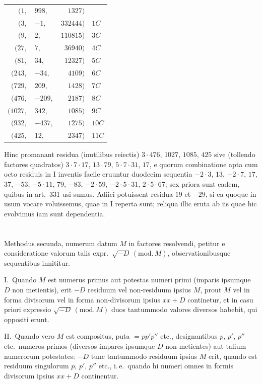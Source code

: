 \documentclass[12pt,a4paper]{article}
\theoremstyle{plain}
\theoremstyle{definition}
\theoremstyle{remark}
\begin{document}
\begin{center}
\begin{tabular}{rlrl}
$(1,$ & $998,$ & $1327)$ &\\
$(3,$ & $-1,$ & $332444)$ & $1C$\\
$(9,$ & $2,$ & $110815)$ & $3C$\\
$(27,$ & $7,$ & $36940)$ & $4C$\\
$(81,$ & $34,$ & $12327)$ & $5C$\\
$(243,$ & $-34,$ & $4109)$ & $6C$\\
$(729,$ & $209,$ & $1428)$ & $7C$\\
$(476,$ & $-209,$ & $2187)$ & $8C$\\
$(1027,$ & $342,$ & $1085)$ & $9C$\\
$(932,$ & $-437,$ & $1275)$ & $10C$\\
$(425,$ & $12,$ & $2347)$ & $11C$
\end{tabular}
\end{center}

Hinc promanant residua (inutilibus reiectis) $3\cdot 476$, $1027$, $1085$, $425$ sive (tollendo factores quadratos) $3\cdot 7\cdot 17$, $13\cdot 79$, $5\cdot 7\cdot 31$, $17$, e quorum combinatione apta cum octo residuis in I inventis facile eruuntur duodecim sequentia $-2\cdot 3$, $13$, $-2\cdot 7$, $17$, $37$, $-53$, $-5\cdot 11$, $79$, $-83$, $-2\cdot 59$, $-2\cdot 5\cdot 31$, $2\cdot 5\cdot 67$; sex priora sunt eadem, quibus in art.\ 331 usi sumus. Adiici potuissent residua $19$ et $-29$, si ea quoque in usum vocare voluissemus, quae in I reperta sunt; reliqua illic eruta ab iis quae hic evolvimus iam sunt dependentia.

\section{}

Methodus secunda, numerum datum $M$ in factores resolvendi, petitur e consideratione valorum talis expr.~$\surd{-D}\,(\mathrm{mod.}\,M)$, observationibusque sequentibus innititur.

\textsc{I.}\ Quando $M$ est numerus primus aut potestas numeri primi (imparis ipsumque $D$ non metientis), erit $-D$ residuum vel non-residuum ipsius $M$, prout $M$ vel in forma divisorum vel in forma non-divisorum ipsius $xx+D$ continetur, et in casu priori expressio $\surd{-D}\,(\mathrm{mod.}\,M)$ duos tantummodo valores diversos habebit, qui oppositi erunt.

\textsc{II.}\ Quando vero $M$ est compositus, puta $=pp'p''$ etc., designantibus $p$, $p'$, $p''$ etc.\ numeros primos (diversos impares ipsumque $D$ non metientes) aut talium numerorum potestates: $-D$ tunc tantummodo residuum ipsius $M$ erit, quando est residuum singulorum $p$, $p'$, $p''$ etc., i.\,e.\ quando hi numeri omnes in formis divisorum ipsius $xx+D$ continentur.
\end{document}
